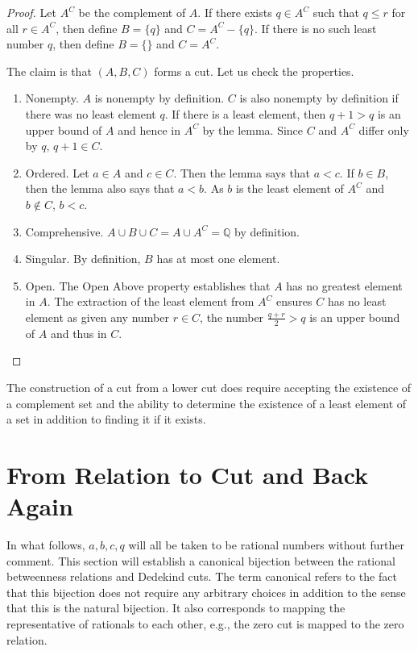 \documentclass[12pt]{article}
\begin{document}
\begin{proof}
    Let $A^C$ be the complement of $A$. If there exists $q \in A^C$ such that $q \leq r$ for all $r \in A^C$, then define $B = \{q\}$ and $C = A^C - \{q\}$. If there is no such least number $q$, then define $B = \{\}$ and $C = A^C$. 

    The claim is that $(A, B, C)$ forms a cut. Let us check the properties. 

    \begin{enumerate}
        \item Nonempty. $A$ is nonempty by definition. $C$ is also nonempty by definition if there was no least element $q$. If there is a least element, then $q+1 > q$ is an upper bound of $A$ and hence in $A^C$ by the lemma. Since $C$ and $A^C$ differ only by $q$, $q+1 \in C$. 
        \item Ordered. Let $a \in A$ and $c \in C$. Then the lemma says that $ a< c$. If $b \in B$, then the lemma also says that $a < b$. As $b$ is the least element of $A^C$ and $b \notin C$, $ b < c$. 
        \item Comprehensive. $A \cup B \cup C = A \cup A^C = \mathbb{Q}$ by definition. 
        \item Singular. By definition, $B$ has at most one element. 
        \item Open. The Open Above property establishes that $A$ has no greatest element in $A$. The extraction of the least element from $A^C$ ensures $C$ has no least element as given any number $r \in C$, the number $\frac{q+r}{2} > q$ is an upper bound of $A$ and thus in $C$. 
    \end{enumerate}
\end{proof}

The construction of a cut from a lower cut does require accepting the existence of a complement set and the ability to determine the existence of a least element of a set in addition to finding it if it exists. 

\section{From Relation to Cut and Back Again}

In what follows, $a, b, c, q$ will all be taken to be rational numbers without further comment. This section will establish a canonical bijection between the rational betweenness relations and Dedekind cuts. The term canonical refers to the fact that this bijection does not require any arbitrary choices in addition to the sense that this is the natural bijection. It also corresponds to mapping the representative of rationals to each other, e.g., the zero cut is mapped to the zero relation. 
\end{document}
